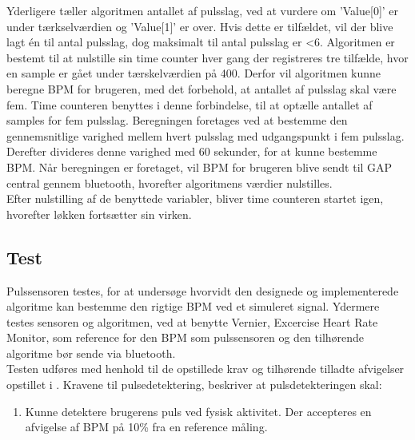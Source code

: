Yderligere tæller algoritmen antallet af pulsslag, ved at vurdere om 'Value[0]' er under tærkselværdien og 'Value[1]' er over. Hvis dette er tilfældet, vil der blive lagt én til antal pulsslag, dog maksimalt til antal pulsslag er <6. Algoritmen er bestemt til at nulstille sin time counter hver gang der registreres tre tilfælde, hvor en sample er gået under tærskelværdien på 400. Derfor vil algoritmen kunne beregne BPM for brugeren, med det forbehold, at antallet af pulsslag skal være fem. Time counteren benyttes i denne forbindelse, til at optælle antallet af samples for fem pulsslag. Beregningen foretages ved at bestemme den gennemsnitlige varighed mellem hvert pulsslag med udgangspunkt i fem pulsslag. Derefter divideres denne varighed med 60 sekunder, for at kunne bestemme BPM. Når beregningen er foretaget, vil BPM for brugeren blive sendt til GAP central gennem bluetooth, hvorefter algoritmens værdier nulstilles.\\
Efter nulstilling af de benyttede variabler, bliver time counteren startet igen, hvorefter løkken fortsætter sin virken.


\subsection{Test}
Pulssensoren testes, for at undersøge hvorvidt den designede og implementerede algoritme kan bestemme den rigtige BPM ved et simuleret signal. Ydermere testes sensoren og algoritmen, ved at benytte Vernier, Excercise Heart Rate Monitor, som reference for den BPM som pulssensoren og den tilhørende algoritme bør sende via bluetooth. \\
Testen udføres med henhold til de opstillede krav og tilhørende tilladte afvigelser opstillet i . Kravene til pulsedetektering, beskriver at pulsdetekteringen skal:
\begin{enumerate}
\item Kunne detektere brugerens puls ved fysisk aktivitet. Der accepteres en afvigelse af BPM på 10\% fra en reference måling.
\end{enumerate}


